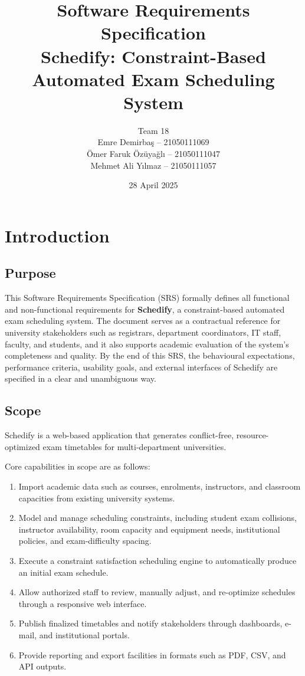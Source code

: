 \documentclass[11pt]{report}
\title{Software Requirements Specification\\[0.5em]\large Schedify: Constraint-Based Automated Exam Scheduling System}
\author{Team 18\\Emre Demirbaş -- 21050111069\\Ömer Faruk Özüyağlı -- 21050111047\\Mehmet Ali Yılmaz -- 21050111057}
\date{28 April 2025}
\begin{document}
\maketitle
\tableofcontents
\listoffigures

\chapter{Introduction}

\section{Purpose}
This Software Requirements Specification (SRS) formally defines all functional and non-functional requirements for \textbf{Schedify}, a constraint-based automated exam scheduling system. The document serves as a contractual reference for university stakeholders such as registrars, department coordinators, IT staff, faculty, and students, and it also supports academic evaluation of the system's completeness and quality. By the end of this SRS, the behavioural expectations, performance criteria, usability goals, and external interfaces of Schedify are specified in a clear and unambiguous way.

\section{Scope}
Schedify is a web-based application that generates conflict-free, resource-optimized exam timetables for multi-department universities.

Core capabilities in scope are as follows:
\begin{enumerate}
\item Import academic data such as courses, enrolments, instructors, and classroom capacities from existing university systems.
\item Model and manage scheduling constraints, including student exam collisions, instructor availability, room capacity and equipment needs, institutional policies, and exam-difficulty spacing.
\item Execute a constraint satisfaction scheduling engine to automatically produce an initial exam schedule.
\item Allow authorized staff to review, manually adjust, and re-optimize schedules through a responsive web interface.
\item Publish finalized timetables and notify stakeholders through dashboards, e-mail, and institutional portals.
\item Provide reporting and export facilities in formats such as PDF, CSV, and API outputs.
\end{enumerate}
\end{document}
